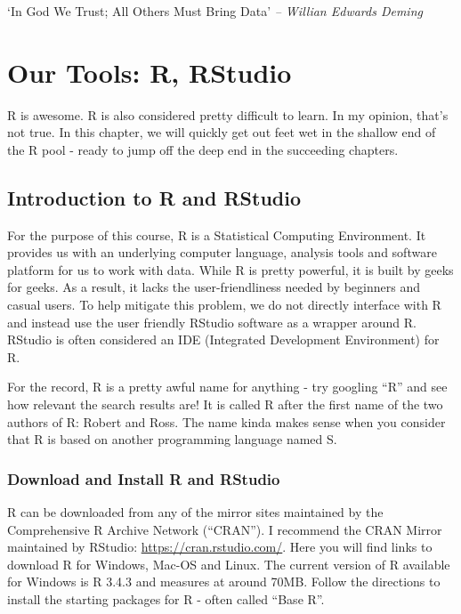 \documentclass[]{krantz}
\theoremstyle{definition}
\theoremstyle{definition}
\theoremstyle{definition}
\theoremstyle{remark}
\begin{document}
`In God We Trust; All Others Must Bring Data' \emph{-- Willian Edwards
Deming}

\chapter{Our Tools: R, RStudio}\label{our-tools-r-rstudio}

R is awesome. R is also considered pretty difficult to learn. In my
opinion, that's not true. In this chapter, we will quickly get out feet
wet in the shallow end of the R pool - ready to jump off the deep end in
the succeeding chapters.

\section{Introduction to R and
RStudio}\label{introduction-to-r-and-rstudio}

For the purpose of this course, R is a Statistical Computing
Environment. It provides us with an underlying computer language,
analysis tools and software platform for us to work with data. While R
is pretty powerful, it is built by geeks for geeks. As a result, it
lacks the user-friendliness needed by beginners and casual users. To
help mitigate this problem, we do not directly interface with R and
instead use the user friendly RStudio software as a wrapper around R.
RStudio is often considered an IDE (Integrated Development Environment)
for R.

For the record, R is a pretty awful name for anything - try googling
``R'' and see how relevant the search results are! It is called R after
the first name of the two authors of R: Robert and Ross. The name kinda
makes sense when you consider that R is based on another programming
language named S.

\subsection{Download and Install R and
RStudio}\label{download-and-install-r-and-rstudio}

R can be downloaded from any of the mirror sites maintained by the
Comprehensive R Archive Network (``CRAN''). I recommend the CRAN Mirror
maintained by RStudio: \url{https://cran.rstudio.com/}. Here you will
find links to download R for Windows, Mac-OS and Linux. The current
version of R available for Windows is R 3.4.3 and measures at around
70MB. Follow the directions to install the starting packages for R -
often called ``Base R''.
\end{document}
